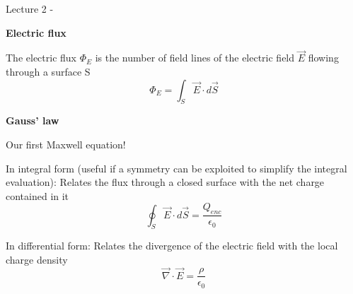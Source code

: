 \renewcommand{\summarizedlecture}{2 }


%
%
%

\begin{frame}{Lecture \summarizedlecture - \lecturesummarytitle}

\begin{itemize}
{\small

\item {\bf Electric flux}
  \begin{itemize}
  {\small
     \item The electric flux $\Phi_E$ is the number of field lines of the electric field $\vec{E}$
           flowing through a surface S
        \begin{equation*}
          \Phi_E = \int_{S} \vec{E} \cdot d\vec{S}
        \end{equation*}
  }
  \end{itemize}

\item {\bf Gauss' law}
  \begin{itemize}
  {\small
     \item Our first Maxwell equation!
     \item In integral form (useful if a symmetry can be exploited to simplify the integral evaluation):
           Relates the flux through a closed surface with the net charge contained in it
           \begin{equation*}
              \oint_{S} \vec{E} \cdot d\vec{S} = \frac{Q_{enc}}{\epsilon_0}
           \end{equation*}
     \item In differential form:
           Relates the divergence of the electric field with the local charge density
           \begin{equation*}
              \vec{\nabla} \cdot \vec{E} = \frac{\rho}{\epsilon_0}
           \end{equation*}
  }
  \end{itemize}

}
\end{itemize}

\end{frame}
